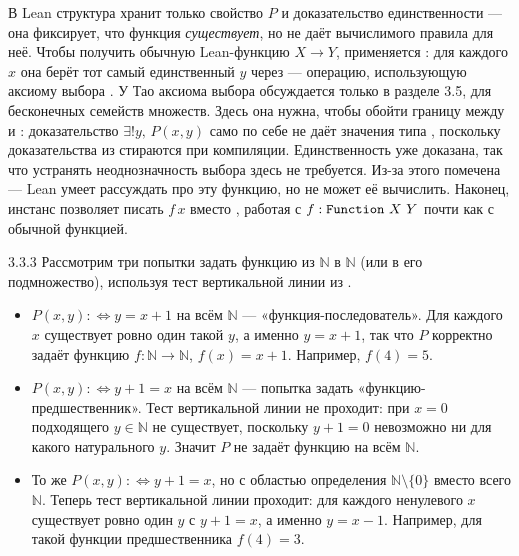 \begin{remark}
В Lean структура  хранит только свойство $P$ и доказательство
единственности — она фиксирует, что функция \emph{существует}, но не даёт вычислимого правила
для неё. Чтобы получить обычную Lean-функцию $X \to Y$, применяется : для
каждого $x$ она берёт тот самый единственный $y$ через  — операцию,
использующую аксиому выбора . У Тао аксиома выбора обсуждается только в
разделе 3.5, для бесконечных семейств множеств. Здесь она нужна, чтобы обойти границу между
 и : доказательство $\exists! y,\, P(x,y)$ само по себе не даёт значения
типа , поскольку доказательства из  стираются при компиляции.
Единственность уже доказана, так что устранять неоднозначность выбора здесь не требуется.
Из-за этого
 помечена  — Lean умеет рассуждать про эту функцию, но
не может её вычислить. Наконец, инстанс  позволяет писать $f\,x$ вместо
, работая с $f : \code{Function}\ X\ Y$ почти как с обычной функцией.
\end{remark}

\begin{example}{3.3.3}{}
Рассмотрим три попытки задать функцию из $\mathbb{N}$ в $\mathbb{N}$ (или в его подмножество),
используя тест вертикальной линии из .
\begin{itemize}
  \item[(a)] $P(x,y) :\iff y=x+1$ на всём $\mathbb{N}$ — «функция-последователь». Для каждого $x$
        существует ровно один такой $y$, а именно $y=x+1$, так что $P$ корректно задаёт
        функцию $f:\mathbb{N}\to\mathbb{N}$, $f(x)=x+1$. Например, $f(4)=5$.
  \item[(b)] $P(x,y) :\iff y+1=x$ на всём $\mathbb{N}$ — попытка задать «функцию-предшественник».
        Тест вертикальной линии не проходит: при $x=0$ подходящего $y \in \mathbb{N}$ не
        существует, поскольку $y+1=0$ невозможно ни для какого натурального $y$. Значит $P$ не
        задаёт функцию на всём $\mathbb{N}$.
  \item[(c)] То же $P(x,y) :\iff y+1=x$, но с областью определения $\mathbb{N} \setminus \{0\}$
        вместо всего $\mathbb{N}$. Теперь тест вертикальной линии проходит: для каждого
        ненулевого $x$ существует ровно один $y$ с $y+1=x$, а именно $y=x-1$. Например, для
        такой функции предшественника $f(4)=3$.
\end{itemize}
\end{example}

